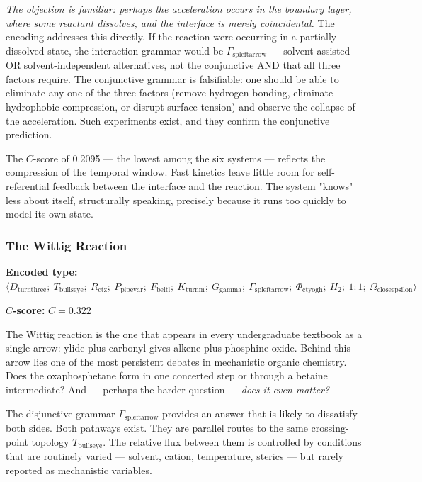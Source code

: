 \documentclass[12pt,a4paper]{article}
\begin{document}
\emph{The objection is familiar: perhaps the acceleration occurs in the boundary layer, where some reactant dissolves, and the interface is merely coincidental.} The encoding addresses this directly. If the reaction were occurring in a partially dissolved state, the interaction grammar would be $\Gamma_{\text{spleftarrow}}$ --- solvent-assisted OR solvent-independent alternatives, not the conjunctive AND that all three factors require. The conjunctive grammar is falsifiable: one should be able to eliminate any one of the three factors (remove hydrogen bonding, eliminate hydrophobic compression, or disrupt surface tension) and observe the collapse of the acceleration. Such experiments exist, and they confirm the conjunctive prediction.

The $C$-score of 0.2095 --- the lowest among the six systems --- reflects the compression of the temporal window. Fast kinetics leave little room for self-referential feedback between the interface and the reaction. The system "knows" less about itself, structurally speaking, precisely because it runs too quickly to model its own state.

\subsubsection{The Wittig Reaction}

\textbf{Encoded type:} $\langle D_{\text{turnthree}};\ T_{\text{bullseye}};\ R_{\text{ctz}};\ P_{\text{pipevar}};\ F_{\text{beltl}};\ K_{\text{turnm}};\ G_{\text{gamma}};\ \Gamma_{\text{spleftarrow}};\ \Phi_{\text{ctyogh}};\ H_2;\ 1{:}1;\ \Omega_{\text{closeepsilon}} \rangle$

\textbf{$C$-score:} $C = 0.322$

The Wittig reaction is the one that appears in every undergraduate textbook as a single arrow: ylide plus carbonyl gives alkene plus phosphine oxide. Behind this arrow lies one of the most persistent debates in mechanistic organic chemistry. Does the oxaphosphetane form in one concerted step or through a betaine intermediate? And --- perhaps the harder question --- \textit{does it even matter?}

The disjunctive grammar $\Gamma_{\text{spleftarrow}}$ provides an answer that is likely to dissatisfy both sides. Both pathways exist. They are parallel routes to the same crossing-point topology $T_{\text{bullseye}}$. The relative flux between them is controlled by conditions that are routinely varied --- solvent, cation, temperature, sterics --- but rarely reported as mechanistic variables.
\end{document}
